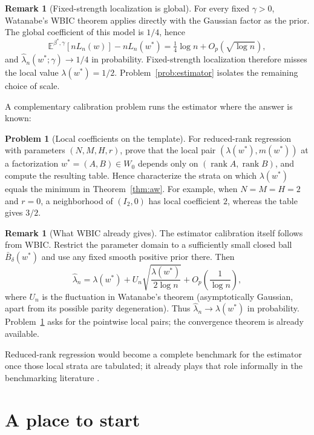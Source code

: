 \documentclass[11pt]{amsart}
\theoremstyle{plain}
\theoremstyle{definition}
\newtheorem{problem}[theorem]{Problem}
\newtheorem{remark}[theorem]{Remark}
\newcommand{\E}{\mathbb{E}}
\DeclareMathOperator{\rank}{rank}
\begin{document}
\begin{remark}[Fixed-strength localization is global]
For every fixed $\gamma>0$, Watanabe's WBIC theorem \cite{watanabe2013} applies directly with the Gaussian factor as the prior. The global coefficient of this model is $1/4$, hence
\[
 \E^{\beta^*,\gamma}[nL_n(w)]-nL_n(w^*)
 =\tfrac14\log n+O_p(\sqrt{\log n}),
\]
and $\hat\lambda_n(w^*;\gamma)\to1/4$ in probability. Fixed-strength localization therefore misses the local value $\lambda(w^*)=1/2$. Problem~\ref{prob:estimator} isolates the remaining choice of scale.
\end{remark}

A complementary calibration problem runs the estimator where the answer is known:

\begin{problem}[Local coefficients on the template]\label{prob:calibration}
For reduced-rank regression with parameters $(N,M,H,r)$, prove that the local pair $(\lambda(w^*),m(w^*))$ at a factorization $w^*=(A,B)\in W_0$ depends only on $(\rank A,\rank B)$, and compute the resulting table. Hence characterize the strata on which $\lambda(w^*)$ equals the minimum in Theorem~\textup{\ref{thm:aw}}. For example, when $N=M=H=2$ and $r=0$, a neighborhood of $(I_2,0)$ has local coefficient $2$, whereas the table gives $3/2$.
\end{problem}

\begin{remark}[What WBIC already gives]
The estimator calibration itself follows from WBIC. Restrict the parameter domain to a sufficiently small closed ball $\bar B_\delta(w^*)$ and use any fixed smooth positive prior there. Then
\[
 \hat\lambda_n
 =\lambda(w^*)+
 U_n\sqrt{\frac{\lambda(w^*)}{2\log n}}
 +O_p\!\left(\frac1{\log n}\right),
\]
where $U_n$ is the fluctuation in Watanabe's theorem (asymptotically Gaussian, apart from its possible parity degeneration). Thus $\hat\lambda_n\to\lambda(w^*)$ in probability. Problem~\ref{prob:calibration} asks for the pointwise local pairs; the convergence theorem is already available.
\end{remark}

Reduced-rank regression would become a complete benchmark for the estimator once those local strata are tabulated; it already plays that role informally in the benchmarking literature \cite{hitchcock2025}.

\section{A place to start}\label{sec:start}
\end{document}
